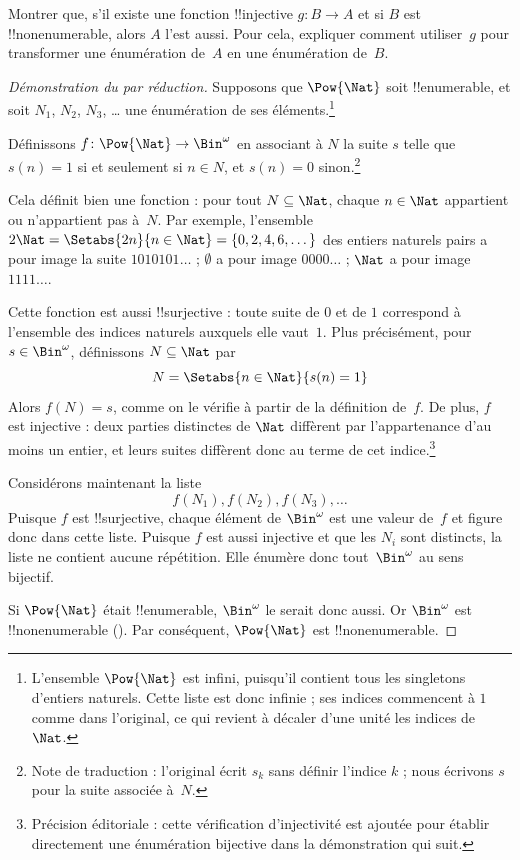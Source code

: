 \documentclass[11pt,a4paper,openany]{memoir}
\begin{document}
\begin{prob}
Montrer que, s'il existe une fonction !!{injective} $g\colon B \to A$
et si $B$ est !!{nonenumerable}, alors $A$ l'est aussi. Pour cela,
expliquer comment utiliser~$g$ pour transformer une énumération
de~$A$ en une énumération de~$B$.
\end{prob}

\begin{proof}[Démonstration du {} par réduction]
Supposons que $\Pow{\Nat}$ soit !!{enumerable}, et soit
$N_{1}$, $N_{2}$, $N_{3}$, \dots{} une énumération de ses
éléments.\footnote{L'ensemble $\Pow{\Nat}$ est infini, puisqu'il
contient tous les singletons d'entiers naturels. Cette liste est
donc infinie ; ses indices commencent à $1$ comme dans l'original,
ce qui revient à décaler d'une unité les indices de~$\Nat$.}

Définissons $f \colon \Pow{\Nat} \to \Bin^\omega$ en associant
à $N$ la suite $s$ telle que $s(n) = 1$ si et seulement si
$n \in N$, et $s(n) = 0$ sinon.\footnote{Note de traduction :
l'original écrit $s_k$ sans définir l'indice $k$ ; nous écrivons
$s$ pour la suite associée à~$N$.}

Cela définit bien une fonction : pour tout $N \subseteq \Nat$,
chaque $n \in \Nat$ appartient ou n'appartient pas à~$N$.
Par exemple, l'ensemble $2\Nat = \Setabs{2n}{n \in \Nat}
= \{0,2, 4, 6, \dots\}$ des entiers naturels pairs a pour
image la suite $1010101\dots$ ; $\emptyset$ a pour image
$0000\dots$ ; $\Nat$ a pour image $1111\dots$.

Cette fonction est aussi !!{surjective} : toute suite de $0$ et
de $1$ correspond à l'ensemble des indices naturels auxquels
elle vaut~$1$. Plus précisément, pour $s \in \Bin^\omega$,
définissons $N \subseteq \Nat$ par
\[
N = \Setabs{n \in \Nat}{s(n) = 1}
\]
Alors $f(N) = s$, comme on le vérifie à partir de la définition
de~$f$. De plus, $f$ est injective : deux parties distinctes de
$\Nat$ diffèrent par l'appartenance d'au moins un entier, et
leurs suites diffèrent donc au terme de cet indice.\footnote{
Précision éditoriale : cette vérification d'injectivité est ajoutée
pour établir directement une énumération bijective dans la
démonstration qui suit.}

Considérons maintenant la liste
\[
f(N_1), f(N_2), f(N_3), \dots
\]
Puisque $f$ est !!{surjective}, chaque élément de $\Bin^\omega$
est une valeur de~$f$ et figure donc dans cette liste. Puisque
$f$ est aussi injective et que les $N_i$ sont distincts, la
liste ne contient aucune répétition. Elle énumère donc
tout~$\Bin^\omega$ au sens bijectif.

Si $\Pow{\Nat}$ était !!{enumerable}, $\Bin^\omega$ le serait
donc aussi. Or $\Bin^\omega$ est !!{nonenumerable}
(). Par conséquent,
$\Pow{\Nat}$ est !!{nonenumerable}.
\end{proof}
\end{document}
